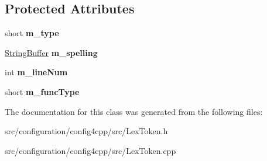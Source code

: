 \subsection*{Protected Attributes}
\begin{DoxyCompactItemize}
\item 
\hypertarget{classCONFIG4CPP__NAMESPACE_1_1LexToken_a59cca9c24306e4e277e8262aa03aff80}{short {\bfseries m\-\_\-type}}\label{classCONFIG4CPP__NAMESPACE_1_1LexToken_a59cca9c24306e4e277e8262aa03aff80}

\item 
\hypertarget{classCONFIG4CPP__NAMESPACE_1_1LexToken_a4eebd8e27e1371036dc2d638f1d929fb}{\hyperlink{classCONFIG4CPP__NAMESPACE_1_1StringBuffer}{String\-Buffer} {\bfseries m\-\_\-spelling}}\label{classCONFIG4CPP__NAMESPACE_1_1LexToken_a4eebd8e27e1371036dc2d638f1d929fb}

\item 
\hypertarget{classCONFIG4CPP__NAMESPACE_1_1LexToken_a8f93bd5b705487011db9cbd3c5e06024}{int {\bfseries m\-\_\-line\-Num}}\label{classCONFIG4CPP__NAMESPACE_1_1LexToken_a8f93bd5b705487011db9cbd3c5e06024}

\item 
\hypertarget{classCONFIG4CPP__NAMESPACE_1_1LexToken_ad01f51ba9f92b166bd96f1c879cdd53c}{short {\bfseries m\-\_\-func\-Type}}\label{classCONFIG4CPP__NAMESPACE_1_1LexToken_ad01f51ba9f92b166bd96f1c879cdd53c}

\end{DoxyCompactItemize}


The documentation for this class was generated from the following files\-:\begin{DoxyCompactItemize}
\item 
src/configuration/config4cpp/src/Lex\-Token.\-h\item 
src/configuration/config4cpp/src/Lex\-Token.\-cpp\end{DoxyCompactItemize}
